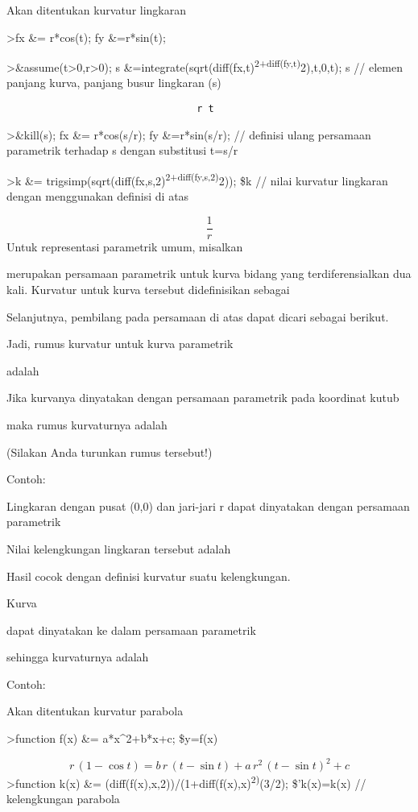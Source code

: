 \documentclass[
]{book}
\begin{document}
Akan ditentukan kurvatur lingkaran

\textgreater fx \&= r*cos(t); fy \&=r*sin(t);

\textgreater\&assume(t\textgreater0,r\textgreater0); s \&=integrate(sqrt(diff(fx,t)\textsuperscript{2+diff(fy,t)}2),t,0,t); s // elemen panjang kurva, panjang busur lingkaran (s)

\begin{verbatim}
                                 r t
\end{verbatim}

\textgreater\&kill(s); fx \&= r*cos(s/r); fy \&=r*sin(s/r); // definisi ulang persamaan parametrik terhadap s dengan substitusi t=s/r

\textgreater k \&= trigsimp(sqrt(diff(fx,s,2)\textsuperscript{2+diff(fy,s,2)}2)); \$k // nilai kurvatur lingkaran dengan menggunakan definisi di atas

\[\frac{1}{r}\]Untuk representasi parametrik umum, misalkan

merupakan persamaan parametrik untuk kurva bidang yang terdiferensialkan dua kali. Kurvatur untuk kurva tersebut didefinisikan sebagai

Selanjutnya, pembilang pada persamaan di atas dapat dicari sebagai berikut.

Jadi, rumus kurvatur untuk kurva parametrik

adalah

Jika kurvanya dinyatakan dengan persamaan parametrik pada koordinat kutub

maka rumus kurvaturnya adalah

(Silakan Anda turunkan rumus tersebut!)

Contoh:

Lingkaran dengan pusat (0,0) dan jari-jari r dapat dinyatakan dengan persamaan parametrik

Nilai kelengkungan lingkaran tersebut adalah

Hasil cocok dengan definisi kurvatur suatu kelengkungan.

Kurva

dapat dinyatakan ke dalam persamaan parametrik

sehingga kurvaturnya adalah

Contoh:

Akan ditentukan kurvatur parabola

\textgreater function f(x) \&= a*x\^{}2+b*x+c; \$y=f(x)

\[r\,\left(1-\cos t\right)=b\,r\,\left(t-\sin t\right)+a\,r^2\,\left( t-\sin t\right)^2+c\]\textgreater function k(x) \&= (diff(f(x),x,2))/(1+diff(f(x),x)\textsuperscript{2)}(3/2); \$'k(x)=k(x) // kelengkungan parabola
\end{document}
